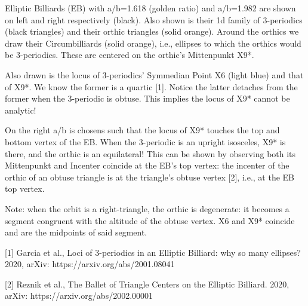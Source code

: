 Elliptic Billiards (EB) with a/b=1.618 (golden ratio) and a/b=1.982 are shown on left and right respectively (black). Also shown is their 1d family of 3-periodics (black triangles) and their orthic triangles (solid orange). Around the orthics we draw their Circumbilliards (solid orange), i.e., ellipses to which the orthics would be 3-periodics. These are centered on the orthic's Mittenpunkt X9*.

Also drawn is the locus of 3-periodics' Symmedian Point X6 (light blue) and that of X9*. We know the former is a quartic [1]. Notice the latter detaches from the former when the 3-periodic is obtuse. This implies the locus of X9* cannot be analytic!

On the right a/b is chosens such that the locus of X9* touches the top and bottom vertex of the EB. When the 3-periodic is an upright isosceles, X9* is there, and the orthic is an equilateral! This can be shown by observing both its Mittenpunkt and Incenter coincide at the EB's top vertex: the incenter of the orthic of an obtuse triangle is at the triangle's obtuse vertex [2], i.e., at the EB top vertex.

Note: when the orbit is a right-triangle, the orthic is degenerate: it becomes a segment congruent with the altitude of the obtuse vertex. X6 and X9* coincide and are the midpoints of said segment.

[1] Garcia et al., Loci of 3-periodics in an Elliptic Billiard: why so many ellipses? 2020, arXiv: https://arxiv.org/abs/2001.08041

[2] Reznik et al., The Ballet of Triangle Centers on the Elliptic Billiard. 2020,  arXiv: https://arxiv.org/abs/2002.00001